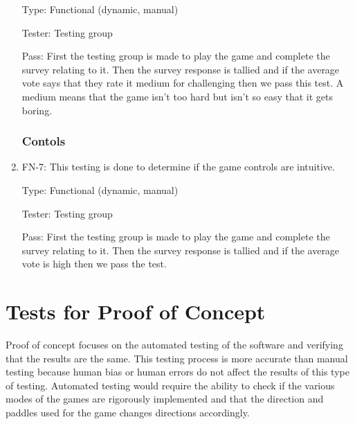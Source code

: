 \documentclass[12pt,letterpaper]{article}
\begin{document}
\begin{enumerate}
	Type: Functional (dynamic, manual)

	Tester: Testing group

	Pass: First the testing group is made to play the game and complete the survey relating to it. Then the survey response is tallied and if the average vote says that they rate it medium for challenging then we pass this test. A medium means that the game isn’t too hard but isn’t so easy that it gets boring.

	\subsubsection{Contols}
	\item FN-7: This testing is done to determine if the game controls are intuitive.

	Type: Functional (dynamic, manual)
	
	Tester: Testing group

	Pass: First the testing group is made to play the game and complete the survey relating to it. Then the survey response is tallied and if the average vote is high then we pass the test.
	\end{enumerate}

	\section{Tests for Proof of Concept}
	Proof of concept focuses on the automated testing of the software and verifying that the results are the same. This testing process is more accurate than manual testing because human bias or human errors do not affect the results of this type of testing. Automated testing would require the ability to check if the various modes of the games are rigorously implemented and that the direction and paddles used for the game changes directions accordingly.
\end{document}
